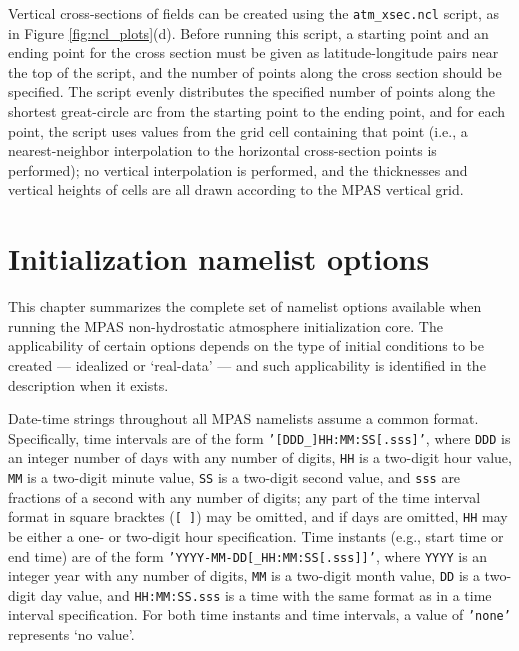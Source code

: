 \documentclass[11pt]{report}
\begin{document}
Vertical cross-sections of fields can be created using the {\tt atm\_xsec.ncl} script, as in Figure \ref{fig:ncl_plots}(d). Before running this script,
a starting point and an ending point for the cross section must be given as latitude-longitude pairs near the top of the script, and the number of points along
the cross section should be specified. The script evenly distributes the specified number of points along the shortest great-circle arc from the 
starting point to the ending point, and for each point, the script uses values from the grid cell containing that point (i.e., a nearest-neighbor interpolation
to the horizontal cross-section points is performed); no vertical interpolation is performed, and the thicknesses and vertical heights of cells are
all drawn according to the MPAS vertical grid.



\appendix  %

\setlength\LTleft{0.0in}


\chapter{Initialization namelist options}

This chapter summarizes the complete set of namelist options available when running the MPAS non-hydrostatic atmosphere initialization core.
The applicability of certain options depends on the type of initial conditions to be created --- idealized or `real-data' --- and such applicability 
is identified in the description when it exists.

Date-time strings throughout all MPAS namelists assume a common format. Specifically, time intervals are of the form {\tt '[DDD\_]HH:MM:SS[.sss]'},
where {\tt DDD} is an integer number of days with any number of digits, {\tt HH} is a two-digit hour value, {\tt MM} is a two-digit minute value, {\tt SS} is a two-digit second value, and {\tt sss} are fractions of a second with any number of digits;
any part of the time interval format in square bracktes ({\tt [ ]}) may be omitted, and if days are omitted, {\tt HH} may be either a one- or two-digit hour specification.
Time instants (e.g., start time or end time) are of the form {\tt 'YYYY-MM-DD[\_HH:MM:SS[.sss]]'}, where {\tt YYYY} is an integer year with any number of digits, {\tt MM}
is a two-digit month value, {\tt DD} is a two-digit day value, and {\tt HH:MM:SS.sss} is a time with the same format as in a time interval specification. For both time instants and time intervals, a value of {\tt 'none'} represents `no value'.
\end{document}
